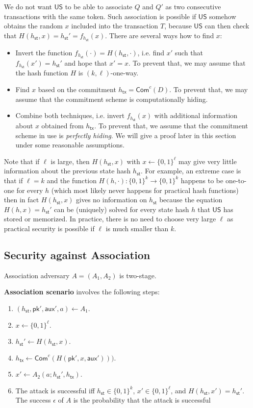 \documentclass{article}
\newcommand{\pubkey}[0]{\mathsf{pk}}
\newcommand{\commitc}[0]{\mathsf{Com}^{c}}
\newcommand{\unisrv}[0]{\mathsf{US}}
\newcommand{\sthash}[0]{h_\mathsf{st}}
\newcommand{\txhash}[0]{h_\mathsf{tx}}
\newcommand{\auxd}[0]{\mathsf{aux}}
\begin{document}
We do not want $\unisrv$ to be able to associate $Q$ and $Q'$ as two consecutive transactions with the same token. Such association is possible if $\unisrv$ somehow obtains the random $x$ included into the transaction $T$, because $\unisrv$ can then check that $H(\sthash,x)=\sthash'=f_{\sthash}(x)$. There are several ways how to find $x$:
\begin{itemize}
\item Invert the function $f_{\sthash}(\cdot)=H(\sthash,\cdot)$, i.e. find $x'$ such that $f_{\sthash}(x')=\sthash'$ and hope that $x'=x$. To prevent that, we may assume that the hash function $H$ is $(k,\ell)$-one-way.
\item Find $x$ based on the commitment $\txhash=\commitc(D)$. To prevent that, we may assume that the commitment scheme is computationally hiding.
\item Combine both techniques, i.e. invert $f_{\sthash}(x)$ with additional information about $x$ obtained from $\txhash$. To prevent that, we assume that the commitment scheme in use is \emph{perfectly hiding}. We will give a proof later in this section under some reasonable assumptions.
\end{itemize}

\noindent Note that if $\ell$ is large, then $H(\sthash,x)$ with $x\gets \{0,1\}^\ell$ may give very little information about the previous state hash $\sthash$.
For example, an extreme case is that if $\ell=k$ and the function $H(h,\cdot)\colon \{0,1\}^k\rightarrow \{0,1\}^k$ happens to be one-to-one for every $h$ (which most likely never happens for practical hash functions) then in fact $H(\sthash,x)$ gives no information on $\sthash$  because the equation $H(h,x)=\sthash'$ can be (uniquely) solved for every state hash $h$ that $\unisrv$ has stored or memorized. In practice, there is no need to choose very large $\ell$ as practical security is possible if $\ell$ is much smaller than $k$.

\subsection{Security against Association}

Association adversary $A=(A_1,A_2)$ is two-stage. \medskip

\noindent\textbf{Association scenario} involves the following steps:
\begin{enumerate}
\item $(\sthash, \pubkey', \auxd', a)\gets A_1$.
\item $x\gets \{0,1\}^\ell$.
\item $\sthash'\gets H(\sthash,x)$.
\item $\txhash\gets\commitc(H(\pubkey',x,\auxd')))$.
\item $x'\gets A_2(a; \sthash',\txhash)$.
\item The attack is successful iff $\sthash\in\{0,1\}^k$, $x'\in\{0,1\}^\ell$, and $H(\sthash,x')=\sthash'$. The success $\epsilon$ of $A$ is the probability that the attack is successful
\end{enumerate}
\end{document}
